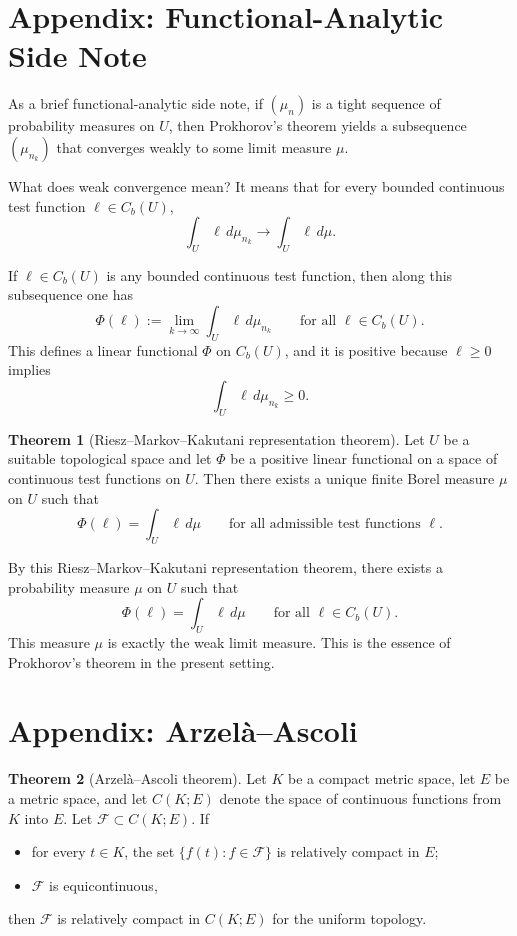 \documentclass[11pt]{article}
\theoremstyle{definition}
\newtheorem{theorem}{Theorem}
\theoremstyle{remark}
\begin{document}
\section*{Appendix: Functional-Analytic Side Note}
As a brief functional-analytic side note, if $(\mu_n)$ is a tight sequence of probability measures on $U$, then Prokhorov's theorem yields a subsequence $(\mu_{n_k})$ that converges weakly to some limit measure $\mu$.

What does weak convergence mean? It means that for every bounded continuous test function $\ell\in C_b(U)$,
\[
  \int_U \ell\,d\mu_{n_k}\to \int_U \ell\,d\mu.
\]

If $\ell\in C_b(U)$ is any bounded continuous test function, then along this subsequence one has
\[
  \Phi(\ell):=\lim_{k\to\infty}\int_U \ell\,d\mu_{n_k}
  \qquad \text{for all } \ell\in C_b(U).
\]
This defines a linear functional $\Phi$ on $C_b(U)$, and it is positive because $\ell\ge 0$ implies
\[
  \int_U \ell\,d\mu_{n_k}\ge 0.
\]

\begin{theorem}[Riesz--Markov--Kakutani representation theorem]
Let $U$ be a suitable topological space and let $\Phi$ be a positive linear functional on a space of continuous test functions on $U$. Then there exists a unique finite Borel measure $\mu$ on $U$ such that
\[
  \Phi(\ell)=\int_U \ell\,d\mu
  \qquad \text{for all admissible test functions } \ell.
\]
\end{theorem}

By this Riesz--Markov--Kakutani representation theorem, there exists a probability measure $\mu$ on $U$ such that
\[
  \Phi(\ell)=\int_U \ell\,d\mu
  \qquad \text{for all } \ell\in C_b(U).
\]
This measure $\mu$ is exactly the weak limit measure. This is the essence of Prokhorov's theorem in the present setting.

\section*{Appendix: Arzel\`a--Ascoli}
\begin{theorem}[Arzel\`a--Ascoli theorem]
Let $K$ be a compact metric space, let $E$ be a metric space, and let $C(K;E)$ denote the space of continuous functions from $K$ into $E$. Let $\mathcal F\subset C(K;E)$. If
\begin{itemize}
\item for every $t\in K$, the set $\{f(t):f\in \mathcal F\}$ is relatively compact in $E$;
\item $\mathcal F$ is equicontinuous,
\end{itemize}
then $\mathcal F$ is relatively compact in $C(K;E)$ for the uniform topology.
\end{theorem}
\end{document}
